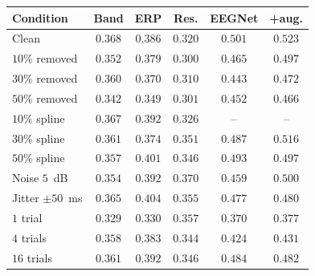 \begin{tabular}{lccccc}
\toprule
Condition & Band & ERP & Res. & EEGNet & +aug. \\
\midrule
Clean & $0.368$ & $0.386$ & $0.320$ & $0.501$ & $0.523$ \\
\midrule
$10\%$ removed & $0.352$ & $0.379$ & $0.300$ & $0.465$ & $0.497$ \\
$30\%$ removed & $0.360$ & $0.370$ & $0.310$ & $0.443$ & $0.472$ \\
$50\%$ removed & $0.342$ & $0.349$ & $0.301$ & $0.452$ & $0.466$ \\
\midrule
$10\%$ spline & $0.367$ & $0.392$ & $0.326$ & -- & -- \\
$30\%$ spline & $0.361$ & $0.374$ & $0.351$ & $0.487$ & $0.516$ \\
$50\%$ spline & $0.357$ & $0.401$ & $0.346$ & $0.493$ & $0.497$ \\
\midrule
Noise $5$~dB & $0.354$ & $0.392$ & $0.370$ & $0.459$ & $0.500$ \\
Jitter $\pm50$~ms & $0.365$ & $0.404$ & $0.355$ & $0.477$ & $0.480$ \\
\midrule
$1$ trial & $0.329$ & $0.330$ & $0.357$ & $0.370$ & $0.377$ \\
$4$ trials & $0.358$ & $0.383$ & $0.344$ & $0.424$ & $0.431$ \\
$16$ trials & $0.361$ & $0.392$ & $0.346$ & $0.484$ & $0.482$ \\
\bottomrule
\end{tabular}
